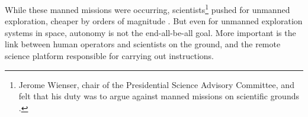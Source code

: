  While these manned missions were occurring, scientists\footnote{Jerome
 Wienser, chair of the Presidential Science
   Advisory Committee, and felt that his duty was to argue against
   manned missions on scientific grounds \cite[Chapter 2]{Levine}.}
 pushed for unmanned exploration, cheaper by orders of magnitude
 \cite[p. 66]{coxMurray}. But even for
unmanned exploration systems in space, autonomy is not the
end-all-be-all goal. More important is the link between human
operators and scientists on the ground, and the remote science
platform responsible for carrying out instructions. 

